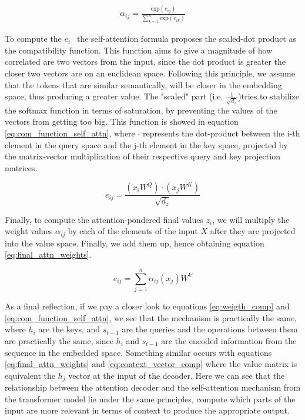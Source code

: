 \begin{equation}
	\label{eq:self_attn_weigth_comp}
	\begin{split}
		\alpha_{ij} = \frac{\text{exp}(e_{ij})}{\sum_{k=1}^{n} \text{exp}(e_{ik})}
	\end{split}
\end{equation}

To compute the $e_{i\cdot}$ the self-attention formula proposes the scaled-dot product as the compatibility function. This function aims to give a magnitude of how correlated are two vectors from the input, since the dot product is greater the closer two vectors are on an euclidean space. Following this principle, we assume that the tokens that are similar semantically, will be closer in the embedding space, thus producing a greater value. The "scaled" part (i.e. $\frac{1}{\sqrt{d_z}}$)tries to stabilize the softmax function in terms of saturation, by preventing the values of the vectors from getting too big. This function is showed in equation \ref{eq:com_function_self_attn}, where $\cdot$ represents the dot-product between the i-th element in the query space and the j-th element in the key space, projected by the matrix-vector multiplication of their respective query and key projection matrices.

\begin{equation}
	\label{eq:com_function_self_attn}
	e_{ij} = \frac{(x_i W^Q)\cdot(x_j W^K)}{\sqrt{d_z}}
\end{equation}

Finally, to compute the attention-pondered final values $z_i$, we will multiply the weight values $\alpha_{ij}$ by each of the elements of the input $X$ after they are projected into the value space. Finally, we add them up, hence obtaining equation \ref{eq:final_attn_weights}.

\begin{equation}
	\label{eq:final_attn_weights}
	e_{ij} = \sum_{j=1}^{n} \alpha_{ij}(x_j) W^V
\end{equation}

As a final reflection, if we pay a closer look to equations \ref{eq:weigth_comp} and \ref{eq:com_function_self_attn}, we see that the mechanism is practically the same, where $h_i$ are the keys, and $s_{t-1}$ are the queries and the operations between them are practically the same, since $h_i$ and $s_{t-1}$ are the encoded information from the sequence in the embedded space. Something similar occurs with equations \ref{eq:final_attn_weights} and \ref{eq:context_vector_comp} where the value matrix is equivalent the $h_j$ vector at the input of the decoder. Here we can see that the relationship between the attention decoder and the self-attention mechanism from the transformer model lie under the same principles, compute which parts of the input are more relevant in terms of context to produce the appropriate output.



